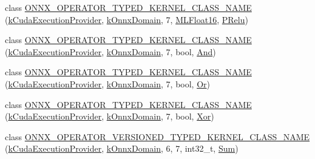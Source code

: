 \begin{DoxyCompactItemize}
\item 
class \mbox{\hyperlink{namespaceonnxruntime_1_1cuda_aab03ec15f81df5b3ec737edaf1a62252}{O\+N\+N\+X\+\_\+\+O\+P\+E\+R\+A\+T\+O\+R\+\_\+\+T\+Y\+P\+E\+D\+\_\+\+K\+E\+R\+N\+E\+L\+\_\+\+C\+L\+A\+S\+S\+\_\+\+N\+A\+ME}} (\mbox{\hyperlink{namespaceonnxruntime_a73ebc64887ddd1968e3cef47ffefe35b}{k\+Cuda\+Execution\+Provider}}, \mbox{\hyperlink{namespaceonnxruntime_ac0e7c0c106a2c9e9594560a3ab289fa0}{k\+Onnx\+Domain}}, 7, \mbox{\hyperlink{uniononnxruntime_1_1MLFloat16}{M\+L\+Float16}}, \mbox{\hyperlink{classonnxruntime_1_1cuda_1_1PRelu}{P\+Relu}})
\item 
class \mbox{\hyperlink{namespaceonnxruntime_1_1cuda_ad31536cee3c5dad5a82000d8661a0bac}{O\+N\+N\+X\+\_\+\+O\+P\+E\+R\+A\+T\+O\+R\+\_\+\+T\+Y\+P\+E\+D\+\_\+\+K\+E\+R\+N\+E\+L\+\_\+\+C\+L\+A\+S\+S\+\_\+\+N\+A\+ME}} (\mbox{\hyperlink{namespaceonnxruntime_a73ebc64887ddd1968e3cef47ffefe35b}{k\+Cuda\+Execution\+Provider}}, \mbox{\hyperlink{namespaceonnxruntime_ac0e7c0c106a2c9e9594560a3ab289fa0}{k\+Onnx\+Domain}}, 7, bool, \mbox{\hyperlink{classonnxruntime_1_1cuda_1_1And}{And}})
\item 
class \mbox{\hyperlink{namespaceonnxruntime_1_1cuda_a5d756db5a6fa6309da77a50150e1fbf2}{O\+N\+N\+X\+\_\+\+O\+P\+E\+R\+A\+T\+O\+R\+\_\+\+T\+Y\+P\+E\+D\+\_\+\+K\+E\+R\+N\+E\+L\+\_\+\+C\+L\+A\+S\+S\+\_\+\+N\+A\+ME}} (\mbox{\hyperlink{namespaceonnxruntime_a73ebc64887ddd1968e3cef47ffefe35b}{k\+Cuda\+Execution\+Provider}}, \mbox{\hyperlink{namespaceonnxruntime_ac0e7c0c106a2c9e9594560a3ab289fa0}{k\+Onnx\+Domain}}, 7, bool, \mbox{\hyperlink{classonnxruntime_1_1cuda_1_1Or}{Or}})
\item 
class \mbox{\hyperlink{namespaceonnxruntime_1_1cuda_a9bc11762c819f278c9ba0c3ced8d4a2f}{O\+N\+N\+X\+\_\+\+O\+P\+E\+R\+A\+T\+O\+R\+\_\+\+T\+Y\+P\+E\+D\+\_\+\+K\+E\+R\+N\+E\+L\+\_\+\+C\+L\+A\+S\+S\+\_\+\+N\+A\+ME}} (\mbox{\hyperlink{namespaceonnxruntime_a73ebc64887ddd1968e3cef47ffefe35b}{k\+Cuda\+Execution\+Provider}}, \mbox{\hyperlink{namespaceonnxruntime_ac0e7c0c106a2c9e9594560a3ab289fa0}{k\+Onnx\+Domain}}, 7, bool, \mbox{\hyperlink{classonnxruntime_1_1cuda_1_1Xor}{Xor}})
\item 
class \mbox{\hyperlink{namespaceonnxruntime_1_1cuda_a0d2f3f01de4f6ae2f37c1cfe9c96c254}{O\+N\+N\+X\+\_\+\+O\+P\+E\+R\+A\+T\+O\+R\+\_\+\+V\+E\+R\+S\+I\+O\+N\+E\+D\+\_\+\+T\+Y\+P\+E\+D\+\_\+\+K\+E\+R\+N\+E\+L\+\_\+\+C\+L\+A\+S\+S\+\_\+\+N\+A\+ME}} (\mbox{\hyperlink{namespaceonnxruntime_a73ebc64887ddd1968e3cef47ffefe35b}{k\+Cuda\+Execution\+Provider}}, \mbox{\hyperlink{namespaceonnxruntime_ac0e7c0c106a2c9e9594560a3ab289fa0}{k\+Onnx\+Domain}}, 6, 7, int32\+\_\+t, \mbox{\hyperlink{classonnxruntime_1_1cuda_1_1Sum}{Sum}})

\end{DoxyCompactItemize}
